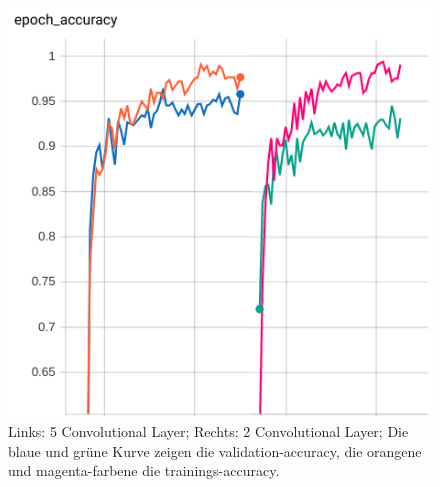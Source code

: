 \documentclass[aspectratio=1610, 9pt]{beamer}
\begin{document}
\begin{frame}
\begin{columns}
\begin{figure}
      \centering
      \includegraphics[scale=0.4]{images/models.png}     
      \caption{Links: 5 Convolutional Layer; Rechts: 2 Convolutional Layer; Die blaue und grüne Kurve zeigen die validation-accuracy, die orangene und magenta-farbene die trainings-accuracy.}
      \label{fig:acc}
    \end{figure}

\end{columns}

\end{frame}



\begin{frame}

\end{frame}


%
\end{document}
